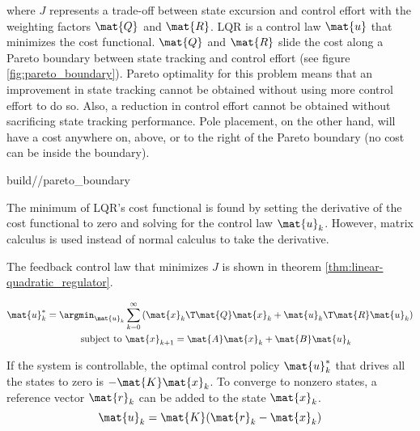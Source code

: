 where $J$ represents a trade-off between \gls{state} excursion and
\gls{control effort} with the weighting factors $\mat{Q}$ and $\mat{R}$. LQR is
a \gls{control law} $\mat{u}$ that minimizes the cost functional. $\mat{Q}$ and
$\mat{R}$ slide the cost along a Pareto boundary between state tracking and
\gls{control effort} (see figure \ref{fig:pareto_boundary}). Pareto optimality
for this problem means that an improvement in state \gls{tracking} cannot be
obtained without using more \gls{control effort} to do so. Also, a reduction in
\gls{control effort} cannot be obtained without sacrificing state \gls{tracking}
performance. Pole placement, on the other hand, will have a cost anywhere on,
above, or to the right of the Pareto boundary (no cost can be inside the
boundary).
\begin{svg}{build/\chapterpath/pareto_boundary}
  \caption{Pareto boundary for LQR}
  \label{fig:pareto_boundary}
\end{svg}

The minimum of LQR's cost functional is found by setting the derivative of the
cost functional to zero and solving for the \gls{control law} $\mat{u}_k$.
However, matrix calculus is used instead of normal calculus to take the
derivative.

The feedback \gls{control law} that minimizes $J$ is shown in theorem
\ref{thm:linear-quadratic_regulator}.
\begin{theorem}
  \label{thm:linear-quadratic_regulator}
  \begin{align}
    \mat{u}_k^* = \argmin_{\mat{u}_k} &\sum\limits_{k=0}^\infty
      \left(\mat{x}_k\T\mat{Q}\mat{x}_k + \mat{u}_k\T\mat{R}\mat{u}_k\right)
      \nonumber \\
    \text{subject to } &\mat{x}_{k+1} = \mat{A}\mat{x}_k + \mat{B}\mat{u}_k
  \end{align}

  If the \gls{system} is controllable, the optimal control policy $\mat{u}_k^*$
  that drives all the \glspl{state} to zero is $-\mat{K}\mat{x}_k$. To converge
  to nonzero \glspl{state}, a \gls{reference} vector $\mat{r}_k$ can be added to
  the \gls{state} $\mat{x}_k$.
  \begin{equation}
    \mat{u}_k = \mat{K}(\mat{r}_k - \mat{x}_k)
  \end{equation}
\end{theorem}

